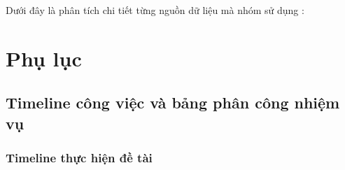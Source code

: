 \documentclass{../hcmut-report}
\begin{document}
\large{Dưới đây là phân tích chi tiết từng nguồn dữ liệu mà nhóm sử dụng :}

% 



\section{Phụ lục}

\subsection{Timeline công việc và bảng phân công nhiệm vụ}
\subsubsection{Timeline thực hiện đề tài}
\end{document}

